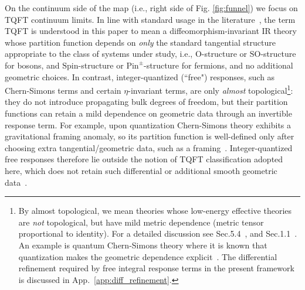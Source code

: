 \documentclass[aps,prx,reprint,superscriptaddress,twocolumn,amsmath,amssymb,amsfonts, nofootinbib]{revtex4-2}
\newcommand{\SO}{\text{SO}}
\theoremstyle{apsstyle}
\begin{document}
On the continuum side of the map  (i.e., right side of Fig. \ref{fig:funnel}) we focus on TQFT continuum limits. In line with standard usage in the literature~\cite{Atiyah1988, Baez1995, Lurie, Freed2014}, the term TQFT is understood in this paper to mean a diffeomorphism-invariant IR theory whose partition function depends on \textit{only} the standard tangential structure appropriate to the class of systems under study, i.e., $\mathrm{O}$-structure or $\SO$-structure for bosons, and $\mathrm{Spin}$-structure or $\mathrm{Pin}^{\pm}$-structure for fermions, and  no additional geometric choices.  
In contrast, integer-quantized (``free") responses, such as Chern-Simons terms and certain $\eta$-invariant terms, are only \emph{almost} topological\footnote{\label{ft:almost}By almost topological, we mean theories whose low-energy effective theories are \textit{not} topological, but have mild metric dependence (metric tensor proportional to identity).
For a detailed discussion see Sec.5.4~\cite{Freed2021}, and Sec.1.1~\cite{Gaiotto2016}. An example is quantum Chern-Simons theory where it is known that quantization makes the geometric dependence explicit~\cite{Witten1989}. The differential refinement required by free integral response terms in the present framework is discussed in App.~\ref{app:diff_refinement}.}: they do not introduce propagating bulk degrees of freedom, but their partition functions can retain a mild dependence on geometric data through an invertible response term. For example, upon quantization Chern-Simons theory exhibits a gravitational framing anomaly, so its partition function is well-defined only after choosing extra tangential/geometric data, such as a framing~\cite{Witten1989, Atiyah1990, Reshetikhin1990}. Integer-quantized free responses therefore lie outside the notion of TQFT classification adopted here, which does not retain such differential or additional smooth geometric data~\cite{note_free}. 
\end{document}
